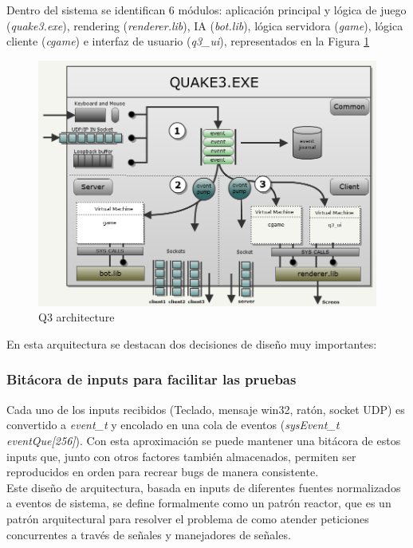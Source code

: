 \documentclass[a4paper,12pt]{report}
\begin{document}
	Dentro del sistema se identifican 6 módulos: aplicación principal y lógica de juego (\textit{quake3.exe}), rendering (\textit{renderer.lib}), IA (\textit{bot.lib}), lógica servidora (\textit{game}), lógica cliente (\textit{cgame}) e interfaz de usuario (\textit{q3\_ui}), representados en la Figura \ref{figarchitecture}

		\begin{center}
			\begin{figure}[h]
				\includegraphics[width=1\textwidth]{images/q3_architecture}
				\caption{Q3 architecture}
				\label{figarchitecture}
			\end{figure}
		\end{center}
	
	En esta arquitectura se destacan dos decisiones de diseño muy importantes:
	
	\subsubsection{Bitácora de inputs para facilitar las pruebas}
	
	Cada uno de los inputs recibidos (Teclado, mensaje win32, ratón, socket UDP) es convertido a \textit{event\_t} y encolado en una cola de eventos (\textit{sysEvent\_t eventQue[256]}). Con esta aproximación se puede mantener una bitácora de estos inputs que, junto con otros factores también almacenados, permiten ser reproducidos en orden para recrear bugs de manera consistente. \cite{johncplan}\\
    
    Este diseño de arquitectura, basada en inputs de diferentes fuentes normalizados a eventos de sistema, se define formalmente como un patrón reactor, que es un patrón arquitectural para resolver el problema de como atender peticiones concurrentes a través de señales y manejadores de señales.\\
	
\end{document}
